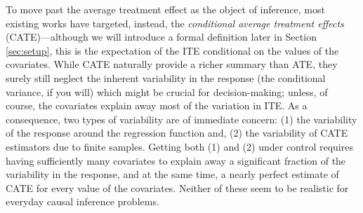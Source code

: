 

To move past the average treatment effect as the object of inference,
most existing works have targeted, instead, the {\em conditional
  average treatment effects} (CATE)---although we will introduce a
formal definition later in Section \ref{sec:setup}, this is the
expectation of the ITE conditional on the values of the covariates. %
While CATE naturally provide a richer summary than ATE,
they surely still neglect the inherent variability in the response
(the conditional variance, if you will) which might be crucial for
decision-making; unless, of course, the covariates explain away most
of the variation in ITE. %
As a consequence, two types of variability are of immediate concern:
(1) the variability of the response around the regression function
and, (2) the variability of CATE estimators due to finite
samples. Getting both (1) and (2) under control requires having
sufficiently many covariates to explain away a significant fraction of
the variability in the response, and at the same time, a nearly
perfect estimate of CATE for every value of the covariates. Neither of
these seem to be realistic for everyday causal inference problems.

